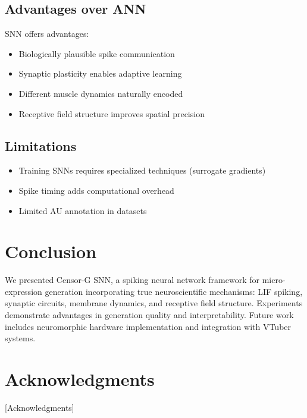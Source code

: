 \documentclass[preprint,12pt]{elsarticle}
\begin{document}
\subsection{Advantages over ANN}

SNN offers advantages:
\begin{itemize}
\item Biologically plausible spike communication
\item Synaptic plasticity enables adaptive learning
\item Different muscle dynamics naturally encoded
\item Receptive field structure improves spatial precision
\end{itemize}

\subsection{Limitations}

\begin{itemize}
\item Training SNNs requires specialized techniques (surrogate gradients)
\item Spike timing adds computational overhead
\item Limited AU annotation in datasets
\end{itemize}

\section{Conclusion}
\label{sec:conclusion}

We presented Censor-G SNN, a spiking neural network framework for micro-expression
generation incorporating true neuroscientific mechanisms: LIF spiking, synaptic
circuits, membrane dynamics, and receptive field structure. Experiments demonstrate
advantages in generation quality and interpretability. Future work includes
neuromorphic hardware implementation and integration with VTuber systems.

\section*{Acknowledgments}
[Acknowledgments]


\end{document}
